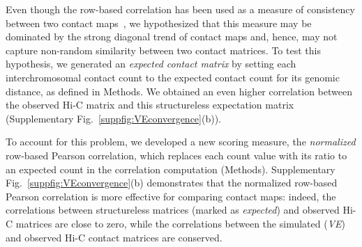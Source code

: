 Even though the row-based correlation has been used as a measure of
consistency between two contact maps~\citep{tjong:physical,
  imakaev:iterative}, we hypothesized that this measure may be
dominated by the strong diagonal trend of contact maps and, hence, may
not capture non-random similarity between two contact matrices.  To
test this hypothesis, we generated an {\em expected contact matrix} by
setting each interchromosomal contact count to the expected contact count
for its genomic distance, as defined in Methods.
We obtained an even higher correlation between the observed
Hi-C matrix and this structureless expectation matrix (Supplementary
Fig.~\ref{suppfig:VEconvergence}(b)).

To account for this problem, we developed a new scoring measure, the
\emph{normalized} row-based Pearson correlation, which replaces each
count value with its ratio to an expected count in the correlation
computation (Methods).  Supplementary
Fig.~\ref{suppfig:VEconvergence}(b) demonstrates that the normalized
row-based Pearson correlation is more effective for comparing contact
maps: indeed, the correlations between structureless matrices (marked
as \textit{expected}) and observed Hi-C matrices are close to zero,
while the correlations between the simulated (\textit{VE}) and
observed Hi-C contact matrices are conserved.

